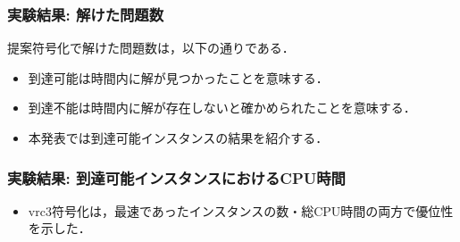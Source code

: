 \documentclass[dvipdfmx,11pt]{beamer}
\begin{document}

\begin{frame}\frametitle{実験結果: 解けた問題数}

提案符号化で解けた問題数は，以下の通りである．
\bigskip

\begin{exampleblock}{}\centering
  
\end{exampleblock}

  
  \begin{itemize}
    \item 到達可能は時間内に解が見つかったことを意味する．
    \item 到達不能は時間内に解が存在しないと確かめられたことを意味する．
    \item 本発表では到達可能インスタンスの結果を紹介する．
  \end{itemize}

\end{frame}

\begin{frame}\frametitle{実験結果: 到達可能インスタンスにおけるCPU時間}

  \begin{table}[t]
    \centering
      
  \end{table}

  \begin{itemize}
    \item vrc3符号化は，最速であったインスタンスの数・総CPU時間の両方で優位性を示した．
  \end{itemize}
  
\end{frame}

\end{document}
